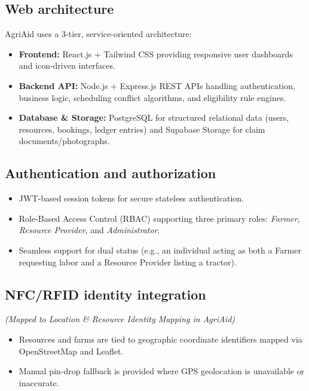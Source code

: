 \documentclass[11pt,a4paper]{article}
\begin{document}
\subsection{Web architecture}
AgriAid uses a 3-tier, service-oriented architecture:
\begin{itemize}[leftmargin=*]
    \item \textbf{Frontend:} React.js + Tailwind CSS providing responsive user dashboards and icon-driven interfaces.
    \item \textbf{Backend API:} Node.js + Express.js REST APIs handling authentication, business logic, scheduling conflict algorithms, and eligibility rule engines.
    \item \textbf{Database \& Storage:} PostgreSQL for structured relational data (users, resources, bookings, ledger entries) and Supabase Storage for claim documents/photographs.
\end{itemize}

\subsection{Authentication and authorization}
\begin{itemize}[leftmargin=*]
    \item JWT-based session tokens for secure stateless authentication.
    \item Role-Based Access Control (RBAC) supporting three primary roles: \textit{Farmer}, \textit{Resource Provider}, and \textit{Administrator}.
    \item Seamless support for dual status (e.g., an individual acting as both a Farmer requesting labor and a Resource Provider listing a tractor).
\end{itemize}

\subsection{NFC/RFID identity integration}
\textit{(Mapped to Location \& Resource Identity Mapping in AgriAid)}
\begin{itemize}[leftmargin=*]
    \item Resources and farms are tied to geographic coordinate identifiers mapped via OpenStreetMap and Leaflet.
    \item Manual pin-drop fallback is provided where GPS geolocation is unavailable or inaccurate.
\end{itemize}
\end{document}
